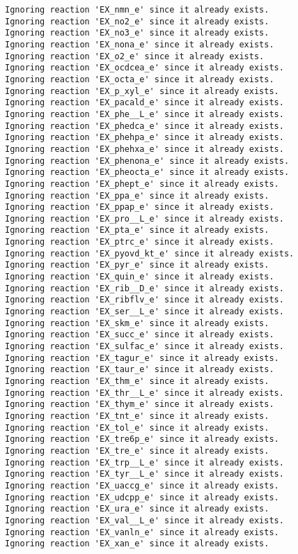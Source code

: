 \documentclass[
  letterpaper,
  DIV=11,
  numbers=noendperiod]{scrartcl}
\begin{document}
\begin{verbatim}
Ignoring reaction 'EX_nmn_e' since it already exists.
Ignoring reaction 'EX_no2_e' since it already exists.
Ignoring reaction 'EX_no3_e' since it already exists.
Ignoring reaction 'EX_nona_e' since it already exists.
Ignoring reaction 'EX_o2_e' since it already exists.
Ignoring reaction 'EX_ocdcea_e' since it already exists.
Ignoring reaction 'EX_octa_e' since it already exists.
Ignoring reaction 'EX_p_xyl_e' since it already exists.
Ignoring reaction 'EX_pacald_e' since it already exists.
Ignoring reaction 'EX_phe__L_e' since it already exists.
Ignoring reaction 'EX_phedca_e' since it already exists.
Ignoring reaction 'EX_phehpa_e' since it already exists.
Ignoring reaction 'EX_phehxa_e' since it already exists.
Ignoring reaction 'EX_phenona_e' since it already exists.
Ignoring reaction 'EX_pheocta_e' since it already exists.
Ignoring reaction 'EX_phept_e' since it already exists.
Ignoring reaction 'EX_ppa_e' since it already exists.
Ignoring reaction 'EX_ppap_e' since it already exists.
Ignoring reaction 'EX_pro__L_e' since it already exists.
Ignoring reaction 'EX_pta_e' since it already exists.
Ignoring reaction 'EX_ptrc_e' since it already exists.
Ignoring reaction 'EX_pyovd_kt_e' since it already exists.
Ignoring reaction 'EX_pyr_e' since it already exists.
Ignoring reaction 'EX_quin_e' since it already exists.
Ignoring reaction 'EX_rib__D_e' since it already exists.
Ignoring reaction 'EX_ribflv_e' since it already exists.
Ignoring reaction 'EX_ser__L_e' since it already exists.
Ignoring reaction 'EX_skm_e' since it already exists.
Ignoring reaction 'EX_succ_e' since it already exists.
Ignoring reaction 'EX_sulfac_e' since it already exists.
Ignoring reaction 'EX_tagur_e' since it already exists.
Ignoring reaction 'EX_taur_e' since it already exists.
Ignoring reaction 'EX_thm_e' since it already exists.
Ignoring reaction 'EX_thr__L_e' since it already exists.
Ignoring reaction 'EX_thym_e' since it already exists.
Ignoring reaction 'EX_tnt_e' since it already exists.
Ignoring reaction 'EX_tol_e' since it already exists.
Ignoring reaction 'EX_tre6p_e' since it already exists.
Ignoring reaction 'EX_tre_e' since it already exists.
Ignoring reaction 'EX_trp__L_e' since it already exists.
Ignoring reaction 'EX_tyr__L_e' since it already exists.
Ignoring reaction 'EX_uaccg_e' since it already exists.
Ignoring reaction 'EX_udcpp_e' since it already exists.
Ignoring reaction 'EX_ura_e' since it already exists.
Ignoring reaction 'EX_val__L_e' since it already exists.
Ignoring reaction 'EX_vanln_e' since it already exists.
Ignoring reaction 'EX_xan_e' since it already exists.

\end{verbatim}
\end{document}
